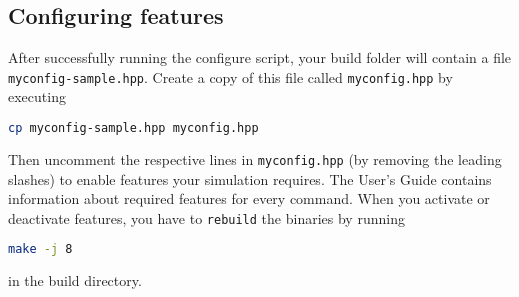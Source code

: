 \documentclass[
paper=a4,                       %
fontsize=11pt,                  %
headinclude=false,              %
footinclude=false,              %
pagesize,                       %
]{scrartcl}
\begin{document}
\subsection{Configuring features}
%
After successfully running the configure script, your build folder will contain a file \texttt{myconfig-sample.hpp}. Create a copy of this file called \texttt{myconfig.hpp} by executing
%
\begin{lstlisting}[language=bash]
cp myconfig-sample.hpp myconfig.hpp
\end{lstlisting}
%
Then uncomment the respective lines in \texttt{myconfig.hpp} (by removing the leading slashes) to enable features your simulation requires. The User's Guide contains information about required features for every \es{} command.
When you activate or deactivate features, you have to \verb!rebuild! the binaries by running
%
\begin{lstlisting}[language=bash]
make -j 8
\end{lstlisting}
%
in the build directory.
\end{document}
